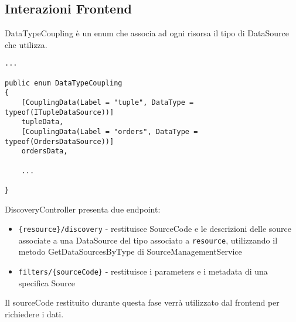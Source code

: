 \subsection{Interazioni Frontend}
\label{chap:frontend}
DataTypeCoupling è un enum che associa ad ogni risorsa il tipo di DataSource che utilizza.
\begin{lstlisting}[caption={DataTypeCoupling.cs}, style=sharpCode]
...

public enum DataTypeCoupling
{
    [CouplingData(Label = "tuple", DataType = typeof(ITupleDataSource))]
    tupleData,
    [CouplingData(Label = "orders", DataType = typeof(OrdersDataSource))]
    ordersData,

    ... 

}
\end{lstlisting}
DiscoveryController presenta due endpoint:
\begin{itemize}
\item \verb|{resource}/discovery| - restituisce SourceCode e le descrizioni delle source associate a una DataSource del tipo associato a \verb|resource|, utilizzando il metodo GetDataSourcesByType di SourceManagementService
\item \verb|filters/{sourceCode}| - restituisce i parameters e i metadata di una specifica Source
\end{itemize}
Il sourceCode restituito durante questa fase verrà utilizzato dal frontend per richiedere i dati.


